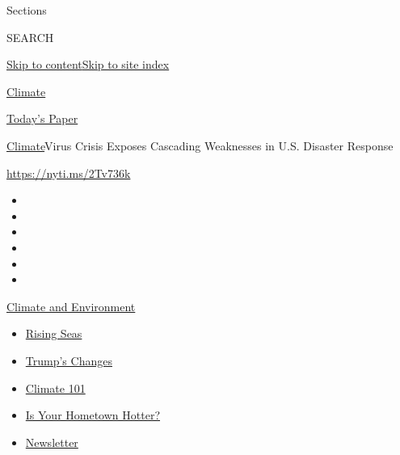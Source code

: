 Sections

SEARCH

\protect\hyperlink{site-content}{Skip to
content}\protect\hyperlink{site-index}{Skip to site index}

\href{https://www.nytimes.com/section/climate}{Climate}

\href{https://myaccount.nytimes.com/auth/login?response_type=cookie\&client_id=vi}{}

\href{https://www.nytimes.com/section/todayspaper}{Today's Paper}

\href{/section/climate}{Climate}\textbar{}Virus Crisis Exposes Cascading
Weaknesses in U.S. Disaster Response

\url{https://nyti.ms/2Tv736k}

\begin{itemize}
\item
\item
\item
\item
\item
\item
\end{itemize}

\href{https://www.nytimes.com/section/climate?action=click\&pgtype=Article\&state=default\&region=TOP_BANNER\&context=storylines_menu}{Climate
and Environment}

\begin{itemize}
\tightlist
\item
  \href{https://www.nytimes.com/2020/07/30/climate/sea-level-inland-floods.html?action=click\&pgtype=Article\&state=default\&region=TOP_BANNER\&context=storylines_menu}{Rising
  Seas}
\item
  \href{https://www.nytimes.com/interactive/2020/climate/trump-environment-rollbacks.html?action=click\&pgtype=Article\&state=default\&region=TOP_BANNER\&context=storylines_menu}{Trump's
  Changes}
\item
  \href{https://www.nytimes.com/interactive/2020/04/19/climate/climate-crash-course-1.html?action=click\&pgtype=Article\&state=default\&region=TOP_BANNER\&context=storylines_menu}{Climate
  101}
\item
  \href{https://www.nytimes.com/interactive/2018/08/30/climate/how-much-hotter-is-your-hometown.html?action=click\&pgtype=Article\&state=default\&region=TOP_BANNER\&context=storylines_menu}{Is
  Your Hometown Hotter?}
\item
  \href{https://www.nytimes.com/newsletters/climate-change?action=click\&pgtype=Article\&state=default\&region=TOP_BANNER\&context=storylines_menu}{Newsletter}
\end{itemize}


